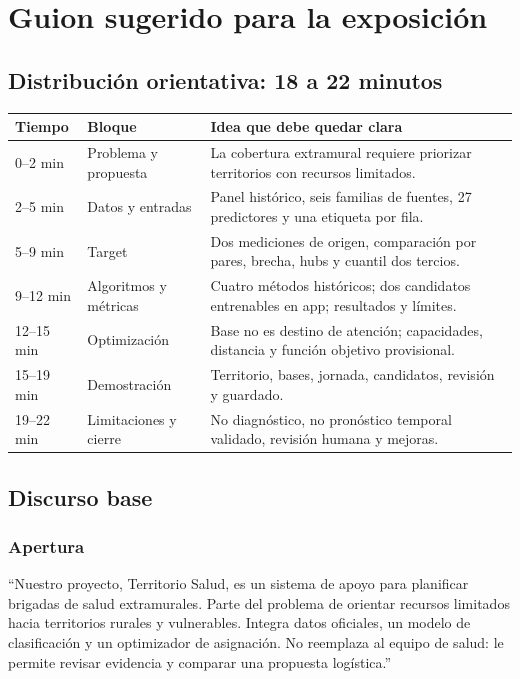 \documentclass[11pt,a4paper]{report}
\begin{document}
\chapter{Guion sugerido para la exposición}
\section{Distribución orientativa: 18 a 22 minutos}
\begin{longtable}{@{}p{}p{}p{}@{}}
\toprule
\textbf{Tiempo} & \textbf{Bloque} & \textbf{Idea que debe quedar clara}\\
\midrule
\endhead
0--2 min & Problema y propuesta & La cobertura extramural requiere priorizar territorios con recursos limitados.\\
2--5 min & Datos y entradas & Panel histórico, seis familias de fuentes, 27 predictores y una etiqueta por fila.\\
5--9 min & Target & Dos mediciones de origen, comparación por pares, brecha, hubs y cuantil dos tercios.\\
9--12 min & Algoritmos y métricas & Cuatro métodos históricos; dos candidatos entrenables en app; resultados y límites.\\
12--15 min & Optimización & Base no es destino de atención; capacidades, distancia y función objetivo provisional.\\
15--19 min & Demostración & Territorio, bases, jornada, candidatos, revisión y guardado.\\
19--22 min & Limitaciones y cierre & No diagnóstico, no pronóstico temporal validado, revisión humana y mejoras.\\
\bottomrule
\end{longtable}

\section{Discurso base}
\subsection*{Apertura}
``Nuestro proyecto, Territorio Salud, es un sistema de apoyo para planificar brigadas de salud extramurales. Parte del problema de orientar recursos limitados hacia territorios rurales y vulnerables. Integra datos oficiales, un modelo de clasificación y un optimizador de asignación. No reemplaza al equipo de salud: le permite revisar evidencia y comparar una propuesta logística.''
\end{document}
